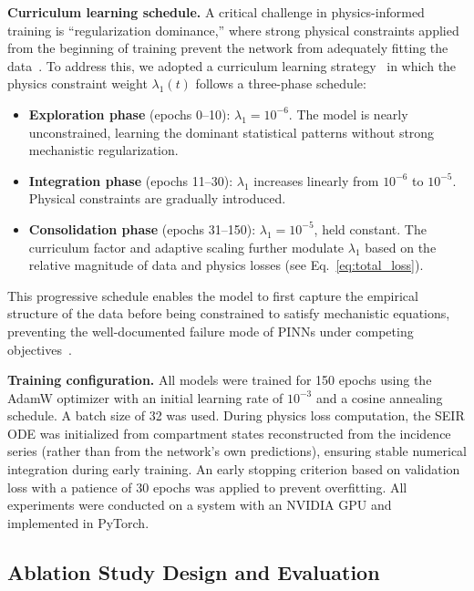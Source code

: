 \documentclass[10pt,letterpaper]{article}
\begin{document}
	\noindent\textbf{Curriculum learning schedule.}
	A critical challenge in physics-informed training is ``regularization dominance,''
	where strong physical constraints applied from the beginning of training prevent
	the network from adequately fitting the data~\cite{wang2021}. To address this, we
	adopted a curriculum learning strategy~\cite{bengio2009} in which the physics
	constraint weight $\lambda_1(t)$ follows a three-phase schedule:
	
	\begin{itemize}
		\item \textbf{Exploration phase} (epochs 0--10): $\lambda_1 = 10^{-6}$.
		The model is nearly unconstrained, learning the dominant statistical
		patterns without strong mechanistic regularization.
		\item \textbf{Integration phase} (epochs 11--30): $\lambda_1$ increases
		linearly from $10^{-6}$ to $10^{-5}$. Physical constraints are
		gradually introduced.
		\item \textbf{Consolidation phase} (epochs 31--150): $\lambda_1 = 10^{-5}$,
		held constant. The curriculum factor and adaptive scaling further
		modulate $\lambda_1$ based on the relative magnitude of data and
		physics losses (see Eq.~\ref{eq:total_loss}).
	\end{itemize}
	
	\noindent This progressive schedule enables the model to first capture the empirical
	structure of the data before being constrained to satisfy mechanistic equations,
	preventing the well-documented failure mode of PINNs under competing
	objectives~\cite{wang2021,raissi2019}.
	
	\noindent\textbf{Training configuration.}
	All models were trained for 150 epochs using the AdamW optimizer with an initial
	learning rate of $10^{-3}$ and a cosine annealing schedule. A batch size of 32
	was used. During physics loss computation, the SEIR ODE was initialized from compartment
	states reconstructed from the incidence series (rather than from the network's
	own predictions), ensuring stable numerical integration during early training. An early
	stopping criterion based on validation loss with a patience of 30 epochs was
	applied to prevent overfitting. All experiments were conducted on a system with
	an NVIDIA GPU and implemented in PyTorch.
	
	\subsection*{Ablation Study Design and Evaluation}
	
\end{document}

